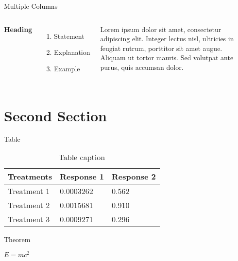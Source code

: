 \documentclass{beamer}
\begin{document}
\begin{frame}{Multiple Columns}
\begin{columns}[c] 

\textbf{Heading}
\begin{enumerate}
\item Statement
\item Explanation
\item Example
\end{enumerate}

Lorem ipsum dolor sit amet, consectetur adipiscing elit. Integer lectus nisl, ultricies in feugiat rutrum, porttitor sit amet augue. Aliquam ut tortor mauris. Sed volutpat ante purus, quis accumsan dolor.

\end{columns}
\end{frame}

\section{Second Section}

\begin{frame}{Table}
\begin{table}
\begin{tabular}{l l l}
\toprule
\textbf{Treatments} & \textbf{Response 1} & \textbf{Response 2}\\
\midrule
Treatment 1 & 0.0003262 & 0.562 \\
Treatment 2 & 0.0015681 & 0.910 \\
Treatment 3 & 0.0009271 & 0.296 \\
\bottomrule
\end{tabular}
\caption{Table caption}
\end{table}
\end{frame}


\begin{frame}{Theorem}
\begin{theorem}
$E = mc^2$
\end{theorem}
\end{frame}
\end{document}
